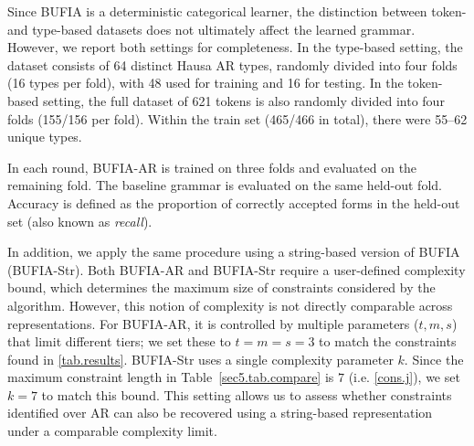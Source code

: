 \documentclass{CUP-JNL-PHO}%
\theoremstyle{definition}
\numberwithin{equation}{section}
\theoremstyle{definition}
\begin{document}
Since BUFIA is a deterministic categorical learner, the distinction 
between token- and type-based datasets does not ultimately affect the 
learned grammar. However, we report both settings for completeness. 
In the type-based setting, the dataset consists of 
64 distinct Hausa AR types, randomly divided into four folds (16 types
per fold), with 48 used for training and 16 for testing. In the token-based setting, the full dataset of 621 
tokens is also randomly divided into four folds (155/156 per fold). Within 
the train set (465/466 in total), there were 55–62 unique types.

In each round, BUFIA-AR is trained on three folds and evaluated on the 
remaining fold. The baseline grammar is evaluated on the same held-out 
fold. Accuracy is defined as the proportion of correctly accepted forms in the held-out set (also known as \textit{recall}).

In addition, we apply the same procedure using a string-based 
version of BUFIA (BUFIA-Str). Both BUFIA-AR and BUFIA-Str require a user-defined complexity 
bound, which determines the maximum size of constraints considered 
by the algorithm. However, this notion of complexity is not directly 
comparable across representations. For BUFIA-AR, it is controlled 
by multiple parameters ($t, m, s$) that limit different tiers; 
we set these to $t = m = s = 3$ to match the constraints found in 
\ref{tab.results}. BUFIA-Str uses a single complexity 
parameter $k$. Since the maximum constraint length in 
Table~\ref{sec5.tab.compare} is $7$ (i.e. \ref{cons.j}), we set $k = 7$
to match this bound. This setting allows us to assess whether 
constraints identified over AR can also be recovered using a 
string-based representation under a comparable complexity limit.
\end{document}
